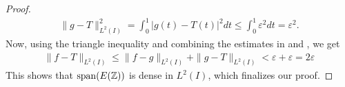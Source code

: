 \documentclass[../thesis.tex]{subfiles}
\begin{document}
\begin{proof}
\begin{align}
        \| g-T \|_{L^2(I)}^2 = \int_0^1 \left|g(t)-T(t) \right|^2dt \leq \int_0^1 \varepsilon^2 dt = \varepsilon^2.
    \end{align}
    Now, using the triangle inequality and combining the estimates in  and , we get
    \begin{align*}
        \| f-T\|_{L^2(I)} \leq  \| f-g\|_{L^2(I)} +\| g-T\|_{L^2(I)} < \varepsilon + \varepsilon =  2 \varepsilon
    \end{align*}
    This shows that $\operatorname{span}(E(\mathbb{Z}))$ is dense in $L^2(I)$, which finalizes our proof.
\end{proof}
\end{document}

